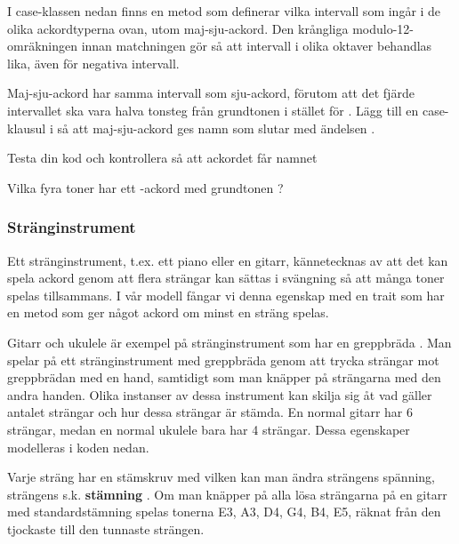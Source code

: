{I case-klassen  nedan finns en metod  som definerar vilka intervall som ingår i de olika ackordtyperna ovan, utom maj-sju-ackord. Den krångliga modulo-12-omräkningen innan matchningen gör så att intervall i olika oktaver behandlas lika, även för negativa intervall.


\Task

\Subtask Maj-sju-ackord har samma intervall som sju-ackord, förutom att det fjärde intervallet ska vara  halva tonsteg från grundtonen i stället för . Lägg till en case-klausul i  så att maj-sju-ackord ges namn som slutar med ändelsen .

\Subtask Testa din kod och kontrollera så att ackordet  får namnet 


\Subtask Vilka fyra toner har ett -ackord med grundtonen ?

\subsubsection{Stränginstrument}

Ett stränginstrument, t.ex. ett piano eller en gitarr, kännetecknas av att det kan spela ackord genom att flera strängar kan sättas i svängning så att många toner spelas tillsammans. I vår modell fångar vi denna egenskap med en trait  som har en metod  som ger något ackord om minst en sträng spelas.

Gitarr och ukulele är exempel på stränginstrument som har en greppbräda . Man spelar på ett stränginstrument med greppbräda  genom att trycka strängar mot greppbrädan med en hand, samtidigt som man knäpper på strängarna med den andra handen. Olika instanser av dessa  instrument kan skilja sig åt vad gäller antalet strängar och hur dessa strängar är stämda. En normal gitarr har 6 strängar, medan en normal ukulele bara har 4 strängar. Dessa egenskaper modelleras i koden nedan.

Varje sträng har en stämskruv med vilken kan man ändra strängens spänning,  strängens s.k. \textbf{stämning} .  Om man knäpper på alla lösa strängarna på en gitarr med standardstämning spelas tonerna E3, A3, D4, G4, B4, E5, räknat från den tjockaste till den tunnaste strängen.

}

